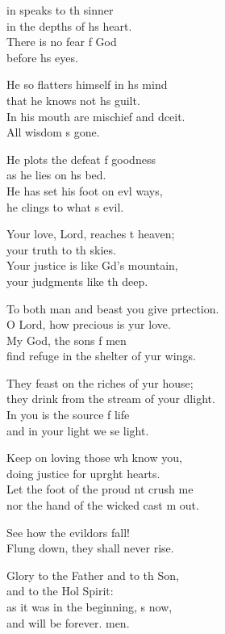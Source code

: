 \settowidth{\versewidth}{To both man and beast you give protection. *}
\begin{psalmverse}%
  \begin{patverse}
    in speaks to th sinner\Med\\
in the depths of h\pointup{\i}s heart.\\
There is no fear f God\Med\\
before h\pointup{\i}s eyes.

He so flatters himself in h\pointup{\i}s mind\Med\\
that he knows not h\pointup{\i}s guilt.\\
In his mouth are mischief and dceit.\Med\\
All wisdom \pointup{\i}s gone.

He plots the defeat f goodness\Med\\
as he lies on h\pointup{\i}s bed.\\
He has set his foot on ev\pointup{\i}l ways,\Med\\
he clings to what \pointup{\i}s evil.

Your love, Lord, reaches t heaven;\Med\\
your truth to th skies.\\
Your justice is like Gd’s mountain,\Med\\
your judgments like th deep.

To both man and beast you give prtection.\Med\\
O Lord, how precious is yur love.\\
My God, the sons f men\Med\\
find refuge in the shelter of yur wings.

They feast on the riches of yur house;\Med\\
they drink from the stream of your dlight.\\
In you is the source f life\Med\\
and in your light we se light.

Keep on loving those wh know you,\Med\\
doing justice for upr\pointup{\i}ght hearts.\\
Let the foot of the proud nt crush me\Med\\
nor the hand of the wicked cast m out.

See how the evildors fall!\Med\\
Flung down, they shall never rise.

Glory to the Father and to th Son,\Med\\
and to the Hol Spirit:\\
as it was in the beginning, \pointup{\i}s now,\Med\\
and will be forever. men. 
  \end{patverse}
\end{psalmverse}
